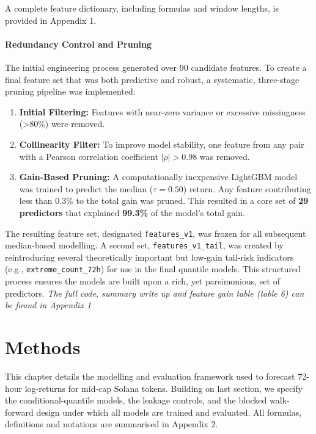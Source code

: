 \documentclass[
  a4paper,
  DIV=11,
  numbers=noendperiod]{scrreprt}
\providecommand{\tightlist}{%
  \setlength{\itemsep}{0pt}\setlength{\parskip}{0pt}}
\begin{document}
A complete feature dictionary, including formulas and window lengths, is
provided in Appendix 1.

\subsubsection{Redundancy Control and
Pruning}\label{redundancy-control-and-pruning}

The initial engineering process generated over 90 candidate features. To
create a final feature set that was both predictive and robust, a
systematic, three-stage pruning pipeline was implemented:

\begin{enumerate}
\def\labelenumi{\arabic{enumi}.}
\tightlist
\item
  \textbf{Initial Filtering:} Features with near-zero variance or
  excessive missingness (\textgreater80\%) were removed.
\item
  \textbf{Collinearity Filter:} To improve model stability, one feature
  from any pair with a Pearson correlation coefficient \(|\rho| > 0.98\)
  was removed.
\item
  \textbf{Gain-Based Pruning:} A computationally inexpensive LightGBM
  model was trained to predict the median (\(\tau=0.50\)) return. Any
  feature contributing less than 0.3\% to the total gain was pruned.
  This resulted in a core set of \textbf{29 predictors} that explained
  \textbf{99.3\%} of the model's total gain.
\end{enumerate}

The resulting feature set, designated \texttt{features\_v1}, was frozen
for all subsequent median-based modelling. A second set,
\texttt{features\_v1\_tail}, was created by reintroducing several
theoretically important but low-gain tail-risk indicators (e.g.,
\texttt{extreme\_count\_72h}) for use in the final quantile models. This
structured process ensures the models are built upon a rich, yet
parsimonious, set of predictors. \emph{The full code, summary write up
and feature gain table (table 6) can be found in Appendix 1}


\chapter{Methods}\label{methods}

This chapter details the modelling and evaluation framework used to
forecast 72-hour log-returns for mid-cap Solana tokens. Building on last
section, we specify the conditional-quantile models, the leakage
controls, and the blocked walk-forward design under which all models are
trained and evaluated. All formulas, definitions and notations are
summarised in Appendix 2.
\end{document}
